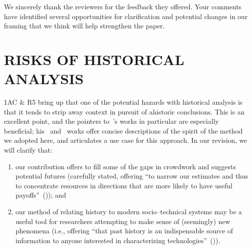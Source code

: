\documentclass[11pt]{article}
\begin{document}
We sincerely thank the reviewers for the feedback they offered. Your comments have identified several opportunities for clarification and potential changes in our framing that we think will help strengthen the paper.

\section*{RISKS OF HISTORICAL ANALYSIS}
1AC \& R5 bring up that one of the potential hazards with
historical analysis is that
it tends to strip away context in pursuit of ahistoric conclusions.
This is an excellent point, and
the pointers to~\citeauthor{rosenberg1994exploring}'s works
in particular are especially beneficial;
his~\citeyear{rosenberg1982inside} and~\citeyear{rosenberg1994exploring} works
offer concise descriptions of the spirit of the method we adopted here,
and articulates a use case for this approach.
In our revision, we will clarify that:
\begin{enumerate}
  \item our contribution offers to fill some of the gaps in crowdwork and suggests potential futures
        (carefully stated, offering
            ``to narrow our estimates
              and thus to concentrate resources
              in directions that are more likely to have useful payoffs''~(\cite{rosenberg1994exploring}));
  and
  \item our method of relating history to modern socio--technical systems may be
        a useful tool for researchers attempting
        to make sense of (seemingly) new phenomena
        (i.e., offering ``that past history is an indispensable source of information
                          to anyone interested in characterizing technologies''~(\cite{rosenberg1982inside})).
\end{enumerate}


\end{document}
